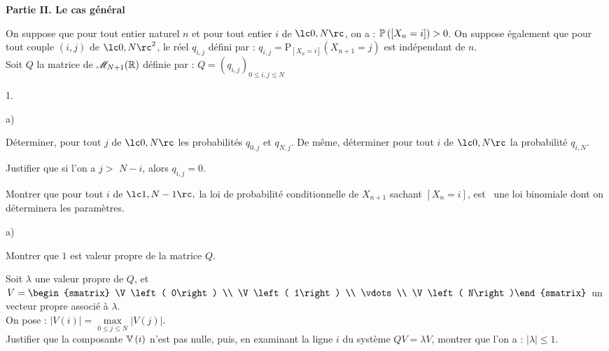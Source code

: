 \documentclass[11pt]{article}%
\begin{document}
\begin{center}\textbf{Partie II. Le cas général}\end{center}

\n On suppose que pour tout entier naturel $n$ et pour tout entier $i$
de $\lc 0,N\rc $, on a : $\mathbb{P}\left(\left[ { X_{n} = i} \right]\right)
>0$. On suppose également que pour tout couple $\left( i,j\right) $ de
$\lc 0,N\rc ^{2}$, le réel $q_{i,j}$ défini par : $ q_{i,j} =
\mathrm{P}_{\left[ X_{n} = i\right] }\left( 
X_{n + 1} = j\right) $ est indépendant de $n$.\\

\n Soit $Q$ la matrice de $\mathscr{M}_{N + 1}(\mathbb{R}) $ définie par : $Q = \left(
q_{i,j}\right)_{0\leq i,j\leq N}$

\begin{noliste}{1.}
 \setlength{\itemsep}{4mm}
\item 
\begin{noliste}{a)}
 \setlength{\itemsep}{2mm}
\item Déterminer, pour tout $j$ de $\lc0,N\rc $
les probabilités $q_{0,j}$ et $q_{N,j}$. De même, déterminer
pour tout $i$ de $\lc 0,N\rc $ la probabilité $q_{i,N}$.

\item Justifier que si l'on a $j>$ $N-i$, alors $q_{i,j} = 0$.

\item Montrer que pour tout $i$ de $\lc 1,N-1\rc,$ la
loi de probabilité conditionnelle de $X_{n + 1}$ sachant $\left[ X_{n}
= i\right] $, est \ une loi binomiale dont on déterminera les
paramètres.
\end{noliste}

\item 
\begin{noliste}{a)}
 \setlength{\itemsep}{2mm}
\item Montrer que $1$ est valeur propre de la matrice $Q$.

\item Soit $\lambda $ une valeur propre de $Q$, et $V = 
\begin{smatrix}
\V\left( 0\right) \\
\V\left( 1\right) \\
\vdots \\
\V\left( N\right)\end{smatrix}
$ un vecteur propre associé à $\lambda.$\\
On pose : $\left| V\left( i\right) \right| = \max \limits_{0\leq
j\leq N}\left| V\left( j\right) \right| $. \\
Justifier que la composante $\mathbb{V}\left( i\right) $ n'est pas nulle, puis,
en
examinant la ligne $i$ du système $QV = \lambda V$, montrer que l'on a
: $\left| \lambda \right| \leq 1$.
\end{noliste}


\end{noliste}
\end{document}
